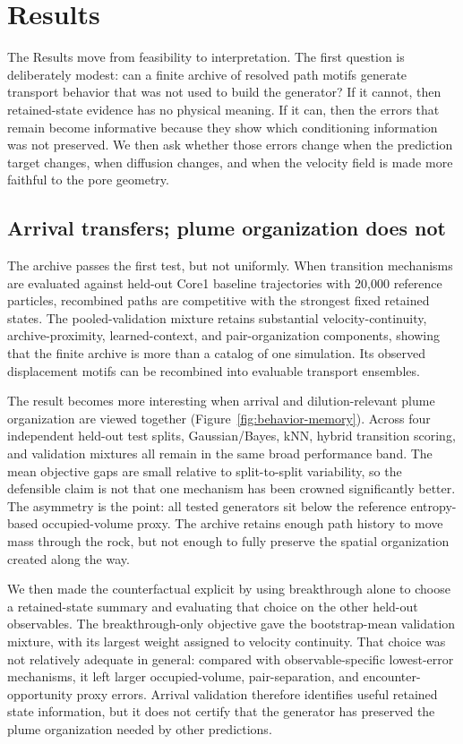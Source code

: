 \documentclass[11pt]{article}
\newcommand{\gb}{Gaussian/Bayes}
\newcommand{\knn}{kNN}
\begin{document}
\section{Results}

The Results move from feasibility to interpretation. The first question is deliberately modest: can a finite archive of resolved path motifs generate transport behavior that was not used to build the generator? If it cannot, then retained-state evidence has no physical meaning. If it can, then the errors that remain become informative because they show which conditioning information was not preserved. We then ask whether those errors change when the prediction target changes, when diffusion changes, and when the velocity field is made more faithful to the pore geometry.

\subsection{Arrival transfers; plume organization does not}

The archive passes the first test, but not uniformly. When transition mechanisms are evaluated against held-out Core1 baseline trajectories with 20,000 reference particles, recombined paths are competitive with the strongest fixed retained states. The pooled-validation mixture retains substantial velocity-continuity, archive-proximity, learned-context, and pair-organization components, showing that the finite archive is more than a catalog of one simulation. Its observed displacement motifs can be recombined into evaluable transport ensembles.

The result becomes more interesting when arrival and dilution-relevant plume organization are viewed together (Figure~\ref{fig:behavior-memory}). Across four independent held-out test splits, \gb{}, \knn{}, hybrid transition scoring, and validation mixtures all remain in the same broad performance band. The mean objective gaps are small relative to split-to-split variability, so the defensible claim is not that one mechanism has been crowned significantly better. The asymmetry is the point: all tested generators sit below the reference entropy-based occupied-volume proxy. The archive retains enough path history to move mass through the rock, but not enough to fully preserve the spatial organization created along the way.

We then made the counterfactual explicit by using breakthrough alone to choose a retained-state summary and evaluating that choice on the other held-out observables. The breakthrough-only objective gave the bootstrap-mean validation mixture, with its largest weight assigned to velocity continuity. That choice was not relatively adequate in general: compared with observable-specific lowest-error mechanisms, it left larger occupied-volume, pair-separation, and encounter-opportunity proxy errors. Arrival validation therefore identifies useful retained state information, but it does not certify that the generator has preserved the plume organization needed by other predictions.
\end{document}
